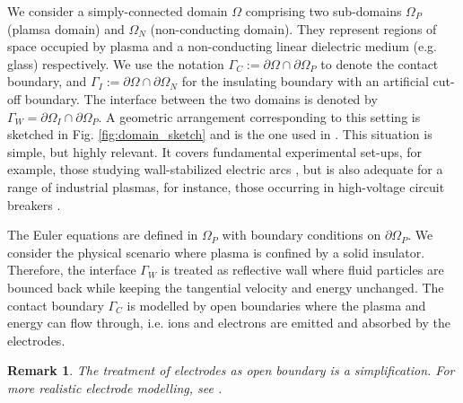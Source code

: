 \documentclass{article}
\newtheorem*{remark}{Remark}
\newcommand{\mycomment}[1]{\noindent\textcolor{orange}{\underline{\textsf{\textbf{#1}}}}}
\begin{document}
We consider a simply-connected domain $\Omega$ comprising two sub-domains $\Omega_P$ (plamsa domain) and $\Omega_N$ (non-conducting domain). They represent regions of space occupied by plasma and a non-conducting linear dielectric medium (e.g. glass) respectively. We use the notation $\Gamma_C := \partial\Omega \cap \partial\Omega_P$ to denote the contact boundary, and $\Gamma_I := \partial\Omega \cap \partial\Omega_N$ for the insulating boundary with an artificial cut-off boundary. The interface between the two domains is denoted by $\Gamma_W = \partial\Omega_I \cap \partial\Omega_P$. A geometric arrangement corresponding to this setting is sketched in Fig. \ref{fig:domain_sketch} and is the one used in \cite[][Ch. 1, Sec. 4]{fuchs_2021}. This situation is simple, but highly relevant. It covers fundamental experimental set-ups, for example, those studying wall-stabilized electric arcs \cite{GGF05}, but is also adequate for a range of industrial plasmas, for instance, those occurring in high-voltage circuit breakers \cite{SEE15,MGU20}. 

The Euler equations are defined in $\Omega_P$ with boundary conditions on $\partial\Omega_P$. We consider the physical scenario where plasma is confined by a solid insulator. Therefore, the interface $\Gamma_W$ is treated as reflective wall where fluid particles are bounced back while keeping the tangential velocity and energy unchanged. The contact boundary $\Gamma_C$ is modelled by open boundaries where the plasma and energy can flow through, i.e. ions and electrons are emitted and absorbed by the electrodes. 

\begin{remark}
    The treatment of electrodes as open boundary is a simplification. For more realistic electrode modelling, see \cite{godyak_1990, parker_1993}.
\end{remark}
\end{document}
